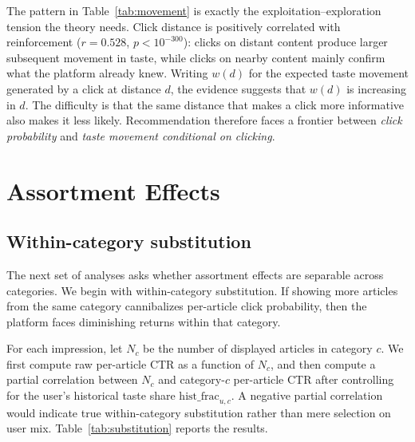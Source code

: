 \documentclass[11pt]{article}
\begin{document}
The pattern in Table~\ref{tab:movement} is exactly the exploitation--exploration tension the theory needs. Click distance is positively correlated with reinforcement ($r = 0.528$, $p<10^{-300}$): clicks on distant content produce larger subsequent movement in taste, while clicks on nearby content mainly confirm what the platform already knew. Writing $w(d)$ for the expected taste movement generated by a click at distance $d$, the evidence suggests that $w(d)$ is increasing in $d$. The difficulty is that the same distance that makes a click more informative also makes it less likely. Recommendation therefore faces a frontier between \emph{click probability} and \emph{taste movement conditional on clicking}.

\section{Assortment Effects}
\label{sec:assortment}

\subsection{Within-category substitution}

The next set of analyses asks whether assortment effects are separable across categories. We begin with within-category substitution. If showing more articles from the same category cannibalizes per-article click probability, then the platform faces diminishing returns within that category.

For each impression, let $N_c$ be the number of displayed articles in category $c$. We first compute raw per-article CTR as a function of $N_c$, and then compute a partial correlation between $N_c$ and category-$c$ per-article CTR after controlling for the user's historical taste share $\text{hist\_frac}_{u,c}$. A negative partial correlation would indicate true within-category substitution rather than mere selection on user mix. Table~\ref{tab:substitution} reports the results.
\end{document}
